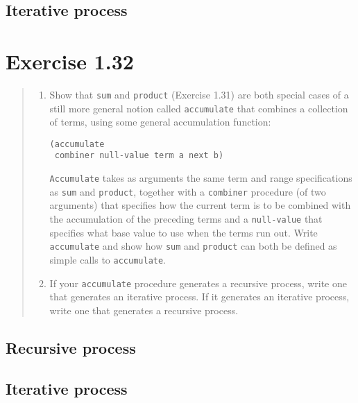\documentclass{article}
\begin{document}
\subsection{Iterative process}


\section{Exercise 1.32}
\begin{quote}
    \begin{enumerate}
        \item Show that \texttt{sum} and \texttt{product} (Exercise 1.31) are
            both special cases of a still more general notion called
            \texttt{accumulate} that combines a collection of terms, using some
            general accumulation function:
            \begin{lstlisting}
(accumulate
 combiner null-value term a next b)
            \end{lstlisting}
            \texttt{Accumulate} takes as arguments the same term and range
            specifications as \texttt{sum} and \texttt{product}, together with
            a \texttt{combiner} procedure (of two arguments) that specifies how
            the current term is to be combined with the accumulation of the
            preceding terms and a \texttt{null-value} that specifies what base
            value to use when the terms run out. Write \texttt{accumulate} and
            show how \texttt{sum} and \texttt{product} can both be defined as
            simple calls to \texttt{accumulate}.
        \item If your \texttt{accumulate} procedure generates a recursive
            process, write one that generates an iterative process. If it
            generates an iterative process, write one that generates a
            recursive process.
    \end{enumerate}
\end{quote}

\subsection{Recursive process}


\subsection{Iterative process}

\end{document}

